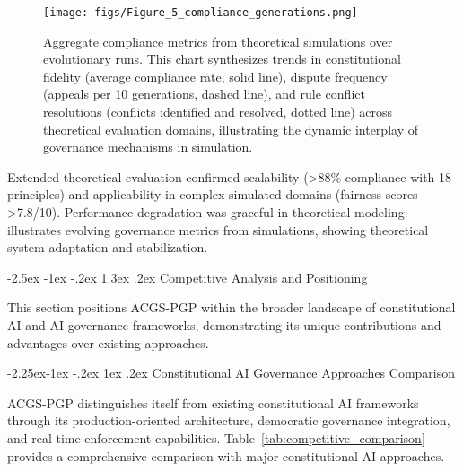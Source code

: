 \documentclass[manuscript,screen,9pt]{acmart}
\makeatletter
\renewcommand\section{\@startsection{section}{1}{\z@}%
  {-2.5ex \@plus -1ex \@minus -.2ex}%
  {1.3ex \@plus.2ex}%
  {\normalfont\Large\bfseries}}
\renewcommand\subsection{\@startsection{subsection}{2}{\z@}%
  {-2.25ex\@plus -1ex \@minus -.2ex}%
  {1ex \@plus .2ex}%
  {\normalfont\large\bfseries}}
\makeatother
\begin{document}
\FloatBarrier %
\begin{figure}[!htb]
\centering
\texttt{[image: figs/Figure\_5\_compliance\_generations.png]}
\caption{Aggregate compliance metrics from theoretical simulations over evolutionary runs. This chart synthesizes trends in constitutional fidelity (average compliance rate, solid line), dispute frequency (appeals per 10 generations, dashed line), and rule conflict resolutions (conflicts identified and resolved, dotted line) across theoretical evaluation domains, illustrating the dynamic interplay of governance mechanisms in simulation.}
\label{fig:compliance-trends}
\end{figure}

Extended theoretical evaluation confirmed scalability (>88\% compliance with 18 principles) and applicability in complex simulated domains (fairness scores >7.8/10). Performance degradation was graceful in theoretical modeling.  illustrates evolving governance metrics from simulations, showing theoretical system adaptation and stabilization.

\section{Competitive Analysis and Positioning}
\label{sec:competitive_analysis}

This section positions ACGS-PGP within the broader landscape of constitutional AI and AI governance frameworks, demonstrating its unique contributions and advantages over existing approaches.

\subsection{Constitutional AI Governance Approaches Comparison}

ACGS-PGP distinguishes itself from existing constitutional AI frameworks through its production-oriented architecture, democratic governance integration, and real-time enforcement capabilities. Table~\ref{tab:competitive_comparison} provides a comprehensive comparison with major constitutional AI approaches.
\end{document}
